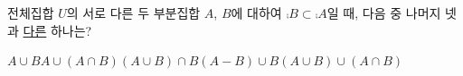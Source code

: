 전체집합 $U$의 서로 다른 두 부분집합 $A$, $B$에 대하여 $\comp{B}\subset\comp{A}$일 때, 다음 중 나머지 넷과 \underline{다른} 하나는?
\begin{choicesii}{$A\cup B$}{$A\cup(A\cap B)$}{$(A\cup B)\cap B$}{$(A-B)\cup B$}{$(A\cup B)\cup(A\cap B)$}\end{choicesii}
